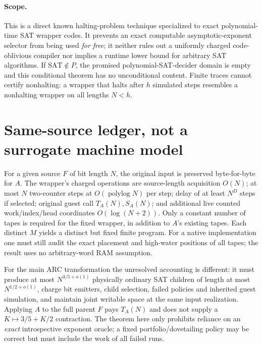\documentclass[11pt]{article}
\begin{document}
\paragraph{Scope.}
This is a direct known halting-problem technique specialized to exact polynomial-time SAT wrapper codes. It prevents an exact computable asymptotic-exponent selector from being used \emph{for free}; it neither rules out a uniformly charged code-oblivious compiler nor implies a runtime lower bound for arbitrary SAT algorithms. If $\mathrm{SAT}\notin P$, the promised polynomial-SAT-decider domain is empty and this conditional theorem has no unconditional content. Finite traces cannot certify nonhalting: a wrapper that halts after $h$ simulated steps resembles a nonhalting wrapper on all lengths $N<h$.

\section{Same-source ledger, not a surrogate machine model}
For a given source $F$ of bit length $N$, the original input is preserved byte-for-byte for $A$. The wrapper's charged operations are source-length acquisition $O(N)$; at most $N$ two-counter steps at $O(\operatorname{polylog}N)$ per step; delay of at least $N^D$ steps if selected; original guest call $T_A(N),S_A(N)$; and additional live counted work/index/head coordinates $O(\log(N+2))$. Only a constant number of tapes is required for the fixed wrapper, in addition to $A$'s existing tapes. Each distinct $M$ yields a distinct but fixed finite program. For a native implementation one must still audit the exact placement and high-water positions of all tapes; the result uses no arbitrary-word RAM assumption.

For the main ARC transformation the unresolved accounting is different: it must produce at most $N^{3/5+o(1)}$ physically ordinary SAT children of length at most $N^{1/2+o(1)}$, charge bit emitters, child selection, failed policies and inherited guest simulation, and maintain joint writable space at the same input realization. Applying $A$ to the full parent $F$ pays $T_A(N)$ and does not supply a $K\mapsto3/5+K/2$ contraction. The theorem here only prohibits reliance on an \emph{exact} introspective exponent oracle; a fixed portfolio/dovetailing policy may be correct but must include the work of all failed runs.
\end{document}
